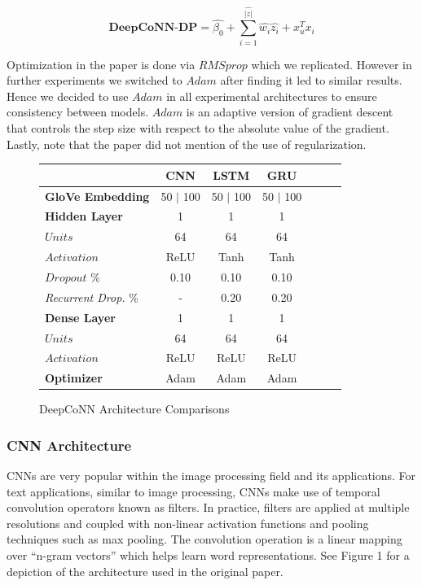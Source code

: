 \documentclass[10pt,twocolumn,letterpaper]{article}
\begin{document}
$$
\textbf{DeepCoNN-DP} = \hat{\beta_{0}} + \sum_{i=1}^{\hat{|z|}}\hat{w_{i}}\hat{z_{i}} + x^{T}_{u}x_{i}
$$

Optimization in the paper is done via $RMSprop$ which we replicated. However in further experiments we switched to $Adam$ after finding it led to similar results. Hence we decided to use $Adam$ in all experimental architectures to ensure consistency between models. $Adam$ is an adaptive version of gradient descent that controls the step size with respect to the absolute value of the gradient. Lastly, note that the paper did not mention of the use of regularization.

\begin{figure}[!ht]
\begin{center}
{\small
\begin{tabular}{l|cccccc}
\hline
& \textbf{CNN} & \textbf{LSTM} & \textbf{GRU}  \\
\hline
\textbf{GloVe Embedding} & 50 $|$ 100 & 50 $|$ 100 & 50 $|$ 100 \\
\hline
\textbf{Hidden Layer} & 1 & 1 & 1 \\
$Units$ & 64 & 64 & 64 \\
$Activation$ & ReLU & Tanh &  Tanh \\
$Dropout$ \% & 0.10 & 0.10 & 0.10 & \\
\textit{Recurrent Drop.} \% & \-- & 0.20 & 0.20 & \\
\hline
\textbf{Dense Layer} & 1 & 1 & 1 \\
$Units$ & 64 & 64 &  64 \\
$Activation$ & ReLU & ReLU &  ReLU \\
\hline
\textbf{Optimizer} & Adam & Adam &  Adam \\
\hline

\end{tabular}
}
\end{center}
\caption{DeepCoNN Architecture Comparisons}
\end{figure}

\subsubsection{CNN Architecture}
CNNs are very popular within the image processing field and its applications.
For text applications, similar to image processing, CNNs make use of temporal convolution operators known as filters. In practice, filters are applied at multiple resolutions and coupled with non-linear activation functions
and pooling techniques such as max pooling. The convolution operation is a linear mapping over “n-gram vectors” which helps learn word representations. See Figure 1 for a depiction of the architecture used in the original paper.
\end{document}

